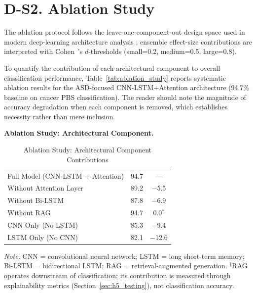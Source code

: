 \section*{D-S2. Ablation Study}
\label{sec:appd_ablation}

The ablation protocol follows the leave-one-component-out design space used in modern deep-learning architecture analysis \cite{lawhern2018eegnet,schirrmeister2017deep}; ensemble effect-size contributions are interpreted with Cohen~\cite{cohen1988statistical}'s $d$-thresholds (small=0.2, medium=0.5, large=0.8).

\iffalse %
To quantify the contribution of each architectural component to overall classification performance, Table~\ref{tab:ablation_study} reports systematic ablation results for the ASD-focused CNN-LSTM+Attention architecture (94.7\% baseline on cancer PBS classification). The reader should note the magnitude of accuracy degradation when each component is removed, which establishes necessity rather than mere inclusion.

\noindent\textbf{Ablation Study: Architectural Component.}

\begin{table}[!htbp]
\tablestripes\tablefontsize
\tablefontsize
\caption{Ablation Study: Architectural Component Contributions}
\begin{tabularx}{\textwidth}{@{} L C C @{}}
\toprule
{} &  &  \\
\midrule
Full Model (CNN-LSTM + Attention) & 94.7 & --- \\
Without Attention Layer & 89.2 & $-$5.5 \\
Without Bi-LSTM & 87.8 & $-$6.9 \\
Without RAG & 94.7 & 0.0$^\dagger$ \\
CNN Only (No LSTM) & 85.3 & $-$9.4 \\
LSTM Only (No CNN) & 82.1 & $-$12.6 \\
\bottomrule
\end{tabularx}
\vspace{0.5em}\noindent\textit{Note.} CNN = convolutional neural network; LSTM = long short-term memory; Bi-LSTM = bidirectional LSTM; RAG = retrieval-augmented generation. $^\dagger$RAG operates downstream of classification; its contribution is measured through explainability metrics (Section~\ref{sec:h5_testing}), not classification accuracy.
\end{table}

